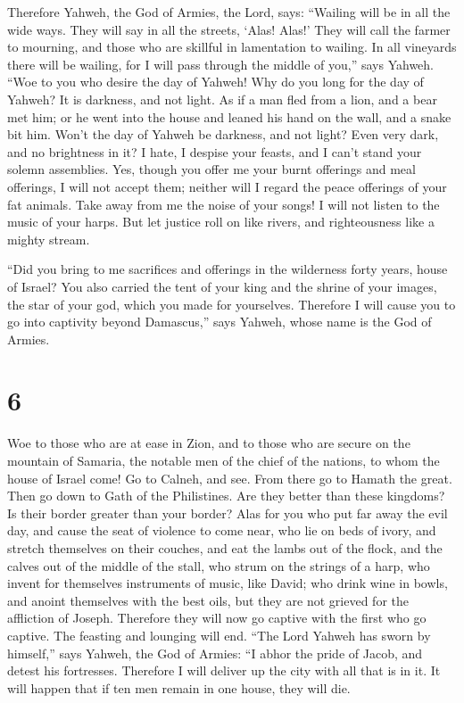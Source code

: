  Therefore Yahweh, the God of Armies, the Lord, says:
``Wailing will be in all the wide ways. They will say in all the
streets, `Alas! Alas!' They will call the farmer to mourning, and those
who are skillful in lamentation to wailing.  In all
vineyards there will be wailing, for I will pass through the middle of
you,'' says Yahweh.  ``Woe to you who desire the day of
Yahweh! Why do you long for the day of Yahweh? It is darkness, and not
light.  As if a man fled from a lion, and a bear met him;
or he went into the house and leaned his hand on the wall, and a snake
bit him.  Won't the day of Yahweh be darkness, and not
light? Even very dark, and no brightness in it?  I hate, I
despise your feasts, and I can't stand your solemn assemblies.
 Yes, though you offer me your burnt offerings and meal
offerings, I will not accept them; neither will I regard the peace
offerings of your fat animals.  Take away from me the noise
of your songs! I will not listen to the music of your harps.
 But let justice roll on like rivers, and righteousness
like a mighty stream.

 ``Did you bring to me sacrifices and offerings in the
wilderness forty years, house of Israel?  You also carried
the tent of your king and the shrine of your images, the star of your
god, which you made for yourselves.  Therefore I will cause
you to go into captivity beyond Damascus,'' says Yahweh, whose name is
the God of Armies.

\hypertarget{section-5}{%
\section{6}\label{section-5}}

 Woe to those who are at ease in Zion, and to those who are
secure on the mountain of Samaria, the notable men of the chief of the
nations, to whom the house of Israel come!  Go to Calneh,
and see. From there go to Hamath the great. Then go down to Gath of the
Philistines. Are they better than these kingdoms? Is their border
greater than your border?  Alas for you who put far away the
evil day, and cause the seat of violence to come near,  who
lie on beds of ivory, and stretch themselves on their couches, and eat
the lambs out of the flock, and the calves out of the middle of the
stall,  who strum on the strings of a harp, who invent for
themselves instruments of music, like David;  who drink wine
in bowls, and anoint themselves with the best oils, but they are not
grieved for the affliction of Joseph.  Therefore they will
now go captive with the first who go captive. The feasting and lounging
will end.  ``The Lord Yahweh has sworn by himself,'' says
Yahweh, the God of Armies: ``I abhor the pride of Jacob, and detest his
fortresses. Therefore I will deliver up the city with all that is in it.
 It will happen that if ten men remain in one house, they
will die.


